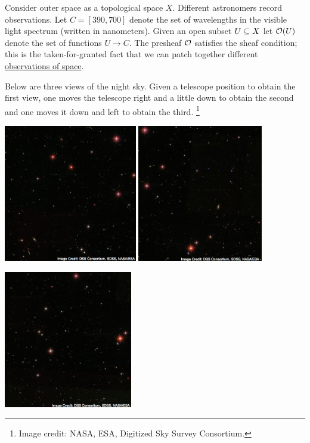 \documentclass[CT4S-EN-RU]{subfiles}
\begin{document}
\begin{applicationENG}
Consider outer space as a topological space $X$. Different astronomers record observations. Let $C=[390,700]$ denote the set of wavelengths in the visible light spectrum (written in nanometers). Given an open subset $U\ss X$ let $\mcO(U)$ denote the set of functions $U\to C$. The presheaf $\mcO$ satisfies the sheaf condition; this is the taken-for-granted fact that we can patch together different \href{http://en.wikipedia.org/wiki/Astrophotography}{\text observations of space}.

Below are three views of the night sky. Given a telescope position to obtain the first view, one moves the telescope right and a little down to obtain the second and one moves it down and left to obtain the third.
\footnote{Image credit: NASA, ESA, Digitized Sky Survey Consortium.}
\begin{center}\parbox{5.5in}{\begin{center}
\includegraphics[height=6cm]{Sky1}\hsp
\includegraphics[height=6cm]{Sky2}\end{center}
\hspace{1.8in}
\includegraphics[height=6cm]{Sky3}}\end{center}

\end{applicationENG}
\end{document}

